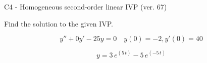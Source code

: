 \begin{exercise}
  \begin{exerciseTitle}C4 - Homogeneous second-order linear IVP (ver. 67)\end{exerciseTitle}
  \begin{exerciseStatement}
    
Find the solution to the given IVP.

    
\[y''+0y'-25y = 0 \hspace{1em} y(0) = -2 , y'(0) = 40\]

  \end{exerciseStatement}
  \begin{exerciseAnswer}
    
\[y= 3 \, e^{\left(5 \, t\right)} - 5 \, e^{\left(-5 \, t\right)}\]

  \end{exerciseAnswer}
\end{exercise}